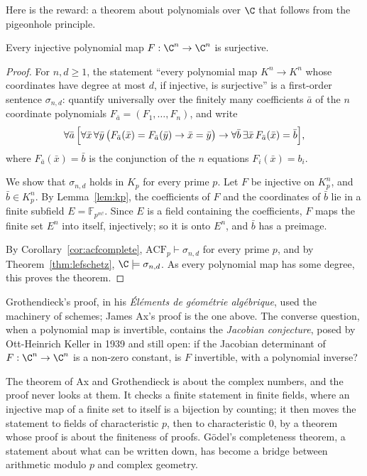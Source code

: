 Here is the reward: a theorem about polynomials over $\C$ that follows from the pigeonhole principle.

\begin{theorem}[Ax, 1968; Grothendieck, 1966]\label{thm:axgrothendieck}
Every injective polynomial map $F:\C^n\to\C^n$ is surjective.
\end{theorem}

\begin{proof}
For $n,d\ge1$, the statement ``every polynomial map $K^n\to K^n$ whose coordinates have degree at most $d$, if injective, is surjective'' is a first-order sentence $\sigma_{n,d}$: quantify universally over the finitely many coefficients $\bar a$ of the $n$ coordinate polynomials $F_{\bar a}=(F_1,\dots,F_n)$, and write
\[
\forall\bar a\,\Bigl[\forall\bar x\,\forall\bar y\,\bigl(F_{\bar a}(\bar x)=F_{\bar a}(\bar y)\to\bar x=\bar y\bigr)\to\forall\bar b\,\exists\bar x\,F_{\bar a}(\bar x)=\bar b\Bigr],
\]
where $F_{\bar a}(\bar x)=\bar b$ is the conjunction of the $n$ equations $F_i(\bar x)=b_i$.

We show that $\sigma_{n,d}$ holds in $K_p$ for every prime $p$. Let $F$ be injective on $K_p^n$, and $\bar b\in K_p^n$. By Lemma~\ref{lem:kp}, the coefficients of $F$ and the coordinates of $\bar b$ lie in a finite subfield $E=\mathbb F_{p^{m!}}$. Since $E$ is a field containing the coefficients, $F$ maps the finite set $E^n$ into itself, injectively; so it is onto $E^n$, and $\bar b$ has a preimage.

By Corollary~\ref{cor:acfcomplete}, $\mathrm{ACF}_p\vdash\sigma_{n,d}$ for every prime $p$, and by Theorem~\ref{thm:lefschetz}, $\C\models\sigma_{n,d}$. As every polynomial map has some degree, this proves the theorem.
\end{proof}

Grothendieck's proof, in his \emph{Éléments de géométrie algébrique}, used the machinery of schemes; James Ax's proof is the one above. The converse question, when a polynomial map is invertible, contains the \emph{Jacobian conjecture}, posed by Ott-Heinrich Keller in 1939 and still open: if the Jacobian determinant of $F:\C^n\to\C^n$ is a non-zero constant, is $F$ invertible, with a polynomial inverse?

\begin{beauty}
The theorem of Ax and Grothendieck is about the complex numbers, and the proof never looks at them. It checks a finite statement in finite fields, where an injective map of a finite set to itself is a bijection by counting; it then moves the statement to fields of characteristic $p$, then to characteristic $0$, by a theorem whose proof is about the finiteness of proofs. Gödel's completeness theorem, a statement about what can be written down, has become a bridge between arithmetic modulo $p$ and complex geometry.
\end{beauty}

